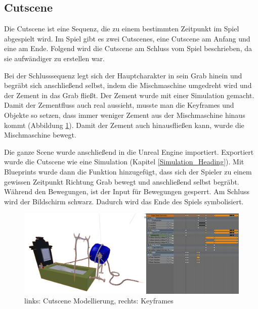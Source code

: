 \subsection{Cutscene}

Die Cutscene ist eine Sequenz, die zu einem bestimmten Zeitpunkt im Spiel abgespielt wird.
Im Spiel gibt es zwei Cutscenes, eine Cutscene am Anfang und eine am Ende. Folgend wird die Cutscene
am Schluss vom Spiel beschrieben, da sie aufwändiger zu erstellen war.

Bei der Schlusssequenz legt sich der Hauptcharakter in sein Grab hinein und begräbt sich anschließend selbst, indem
die Mischmaschine umgedreht wird und der Zement in das Grab fließt. Der Zement wurde mit einer Simulation gemacht.
Damit der Zementfluss auch real aussieht, musste man die Keyframes und Objekte so setzen, dass immer weniger Zement aus
der Mischmaschine hinaus kommt (Abbildung \ref{cutscene:image_modellierung}). Damit der Zement auch hinausfließen kann, wurde die Mischmaschine bewegt.

Die ganze Scene wurde anschließend in die Unreal Engine importiert. Exportiert wurde die Cutscene wie eine Simulation (Kapitel \ref{Simulation_Heading}).
Mit Blueprints wurde dann die Funktion hinzugefügt, dass sich der
Spieler zu einem gewissen Zeitpunkt Richtung Grab bewegt und anschließend selbst begräbt. Während den Bewegungen, ist der Input für Bewegungen gesperrt.
Am Schluss wird der Bildschirm schwarz. Dadurch wird das Ende des Spiels symbolisiert.

\begin{figure}[h]
    \centering
    \includegraphics[width=.8\textwidth]{images/Cutscene_Modellierung.png}
    \caption{links: Cutscene Modellierung, rechts: Keyframes}
    \label{cutscene:image_modellierung}
\end{figure}